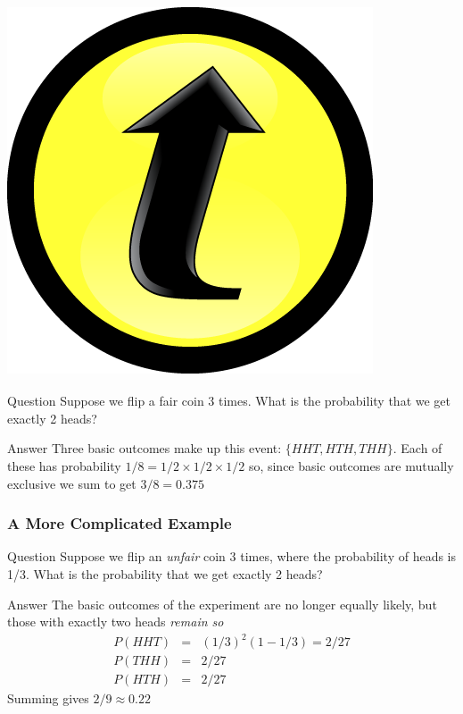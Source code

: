 \documentclass[handout]{beamer}
\begin{document}
\begin{frame}
\frametitle{\includegraphics[scale = 0.05]{./images/clicker} }
\begin{block}{Question}
Suppose we flip a fair coin 3 times. What is the probability that we get exactly 2 heads?
\end{block}

\pause

\begin{block}{Answer}
Three basic outcomes make up this event: $\{HHT, HTH, THH\}$. \pause Each of these has probability $1/8 = 1/2 \times 1/2 \times 1/2$ so, since basic outcomes are mutually exclusive we sum to get \alert{$3/8 = 0.375$}
\end{block}

\end{frame}
\begin{frame}
\frametitle{A More Complicated Example}
\begin{block}{Question}
Suppose we flip an \emph{unfair} coin 3 times, where the probability of heads is 1/3. What is the probability that we get exactly 2 heads?
\end{block}



\begin{block}{Answer}
The basic outcomes of the experiment are no longer equally likely, but those with exactly two heads \emph{\alert{remain so}} 
	\begin{eqnarray*}
	 P(HHT) &=&  (1/3)^2 (1 - 1/3) =  2/27\\ 
	 P(THH) &=&2/27\\ 
	 P(HTH) &=&2/27 
	\end{eqnarray*}
	Summing gives \alert{$2/9 \approx 0.22$}
\end{block}
\end{frame}
\end{document}

